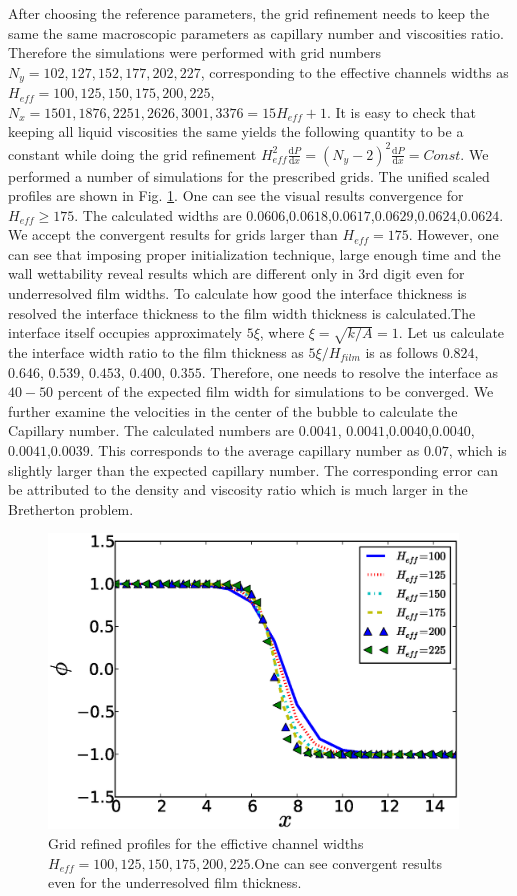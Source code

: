 \documentclass{article}
\begin{document}
After choosing the reference parameters, the grid refinement needs to keep the
same the same macroscopic parameters as capillary number and viscosities ratio.
Therefore the simulations were performed with grid
numbers $N_y=102,127,152,177,202,227$, corresponding to the
effective channels widths as $H_{eff}=100,125,150,175,200,225$,
$N_x=1501,1876,2251,2626,3001,3376=15
H_{eff}+1$. It is easy to check
that keeping all liquid viscosities the same yields the following quantity to
be a
constant while doing the grid refinement
$H_{eff}^2\frac{\mathrm{d}P}{\mathrm{d}x}=(N_y-2)^2\frac{\mathrm{d}P}{\mathrm{d}
x } = Const$. We performed a number of simulations for the prescribed grids.
The unified scaled profiles are shown in Fig. \ref{fig:grid:profiles}. One can
see the visual results convergence for $H_{eff}\geq 175$. The calculated widths
are $0.0606$,$0.0618$,$0.0617$,$0.0629$,$0.0624$,$0.0624$. We accept the
convergent results for grids larger than $H_{eff}=175$. However, one can see
that imposing proper initialization technique, large enough time and the wall
wettability reveal results which are different only in 3rd digit even for
underresolved film widths. To calculate how good the interface thickness is
resolved the interface thickness to the film width thickness is calculated.The
interface itself occupies approximately $5 \xi$, where
$\xi=\sqrt{k/A}=1$. Let us calculate the interface width ratio to the film
thickness as
$5\xi/H_{film}$ is as follows $0.824$, $0.646$,  $0.539$, $0.453$,
$0.400$, $0.355$. Therefore, one needs to
resolve the interface as $40-50$ percent of the
expected film width for simulations to be converged. We further examine the
velocities in the center of the bubble to calculate the Capillary number. The
calculated numbers are $0.0041$, $0.0041$,$0.0040$,$0.0040$,$0.0041$,$0.0039$.
This corresponds to the average capillary number as $0.07$, which is slightly
larger than the expected capillary number. The corresponding error can be
attributed to the density and viscosity ratio which is much larger in the
Bretherton problem.
\begin{figure}
\includegraphics[width=0.97\textwidth]{Figures/Grid/norm_grid_profs.eps}
\caption{Grid refined profiles for the effictive
channel widths
$H_{eff}=100,125,150,175,200,225$.One can see
convergent results even for the underresolved film
thickness.\label{fig:grid:profiles}}
\end{figure}
\end{document}
